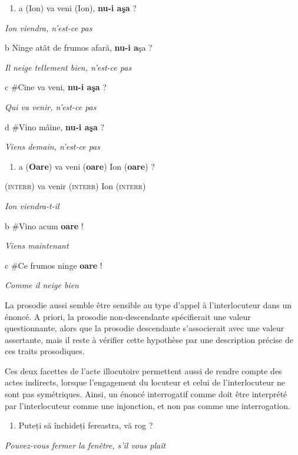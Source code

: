 \begin{enumerate}
\item \label{bkm:Ref299275662}a  (Ion) va veni (Ion), \textbf{nu-i aşa} ?


\end{enumerate}
{\itshape
Ion viendra, n'est-ce pas}

  b  Ninge atât de frumos afară, \textbf{nu-i a}şa ?

{\itshape
Il neige tellement bien, n'est-ce pas}

  c  \#Cine va veni, \textbf{nu-i aşa} ?

{\itshape
Qui va venir, n'est-ce pas}

  d  \#Vino mâine, \textbf{nu-i aşa} ?

{\itshape
Viens demain, n'est-ce pas~}


\begin{enumerate}
\item \label{bkm:Ref299275711}a  (\textbf{Oare})  va veni  (\textbf{oare})  Ion  (\textbf{oare}) ?


\end{enumerate}
\textsc{(interr) } va venir  (\textsc{interr)}  Ion  (\textsc{interr)} 

{\itshape
Ion viendra-t-il} 

  b  \#Vino acum \textbf{oare} !

{\itshape
Viens maintenant}

  c  \#Ce frumos ninge \textbf{oare} !

{\itshape
Comme il neige bien}

La prosodie aussi semble être sensible au type d'appel à l'interlocuteur dans un énoncé. A priori, la prosodie non-descendante spécifierait une valeur questionnante, alors que la prosodie descendante s'associerait avec une valeur assertante, mais il reste à vérifier cette hypothèse par une description précise de ces traits prosodiques.

Ces deux facettes de l'acte illocutoire permettent aussi de rendre compte des actes indirects, lorsque l'engagement du locuteur et celui de l'interlocuteur ne sont pas symétriques. Ainsi, un énoncé interrogatif comme  doit être interprété par l'interlocuteur comme une injonction, et non pas comme une interrogation.


\begin{enumerate}
\item \label{bkm:Ref299096317}Puteți să închideți fereastra, vă rog ?


\end{enumerate}
{\itshape
  Pouvez-vous fermer la fenêtre, s'il vous plaît}

